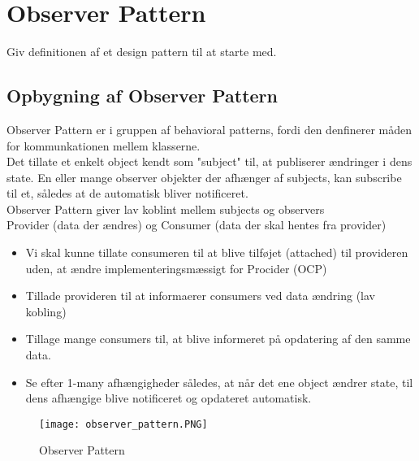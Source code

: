 \documentclass[../SWD_disp.tex]{subfiles}
\begin{document}
\section{Observer Pattern}

Giv definitionen af et design pattern til at starte med.

\subsection{Opbygning af Observer Pattern}
Observer Pattern er i gruppen af behavioral patterns, fordi den denfinerer måden for kommunkationen mellem klasserne.
\\

Det tillate et enkelt object kendt som "subject" til, at publiserer ændringer i dens state. En eller mange observer objekter der afhænger af subjects, kan subscribe til et, således at de automatisk bliver notificeret.
\\

Observer Pattern giver lav koblint mellem subjects og observers
\\

Provider (data der ændres) og Consumer (data der skal hentes fra provider)
\begin{itemize}
    \item Vi skal kunne tillate consumeren til at blive tilføjet (attached) til provideren uden, at ændre implementeringsmæssigt for Procider (OCP)
    \item Tillade provideren til at informaerer consumers ved data ændring (lav kobling)
    \item Tillage mange consumers til, at blive informeret på opdatering af den samme data.
    \item Se efter 1-many afhængigheder således, at når det ene object ændrer state, til dens afhængige blive notificeret og opdateret automatisk.
\end{itemize}

\begin{figure}[H]
    \centering
    \texttt{[image: observer\_pattern.PNG]}
    \caption{Observer Pattern}
    \label{fig:observer_pattern}
\end{figure}
\end{document}
